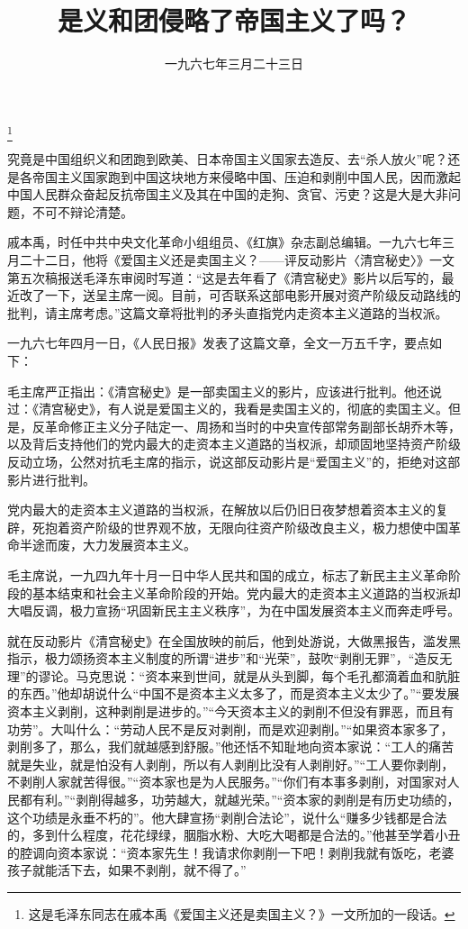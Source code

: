 
\title{是义和团侵略了帝国主义了吗？}
\date{一九六七年三月二十三日}
\thanks{这是毛泽东同志在戚本禹《爱国主义还是卖国主义？》一文所加的一段话。}
\maketitle


究竟是中国组织义和团跑到欧美、日本帝国主义国家去造反、去“杀人放火”呢？还是各帝国主义国家跑到中国这块地方来侵略中国、压迫和剥削中国人民，因而激起中国人民群众奋起反抗帝国主义及其在中国的走狗、贪官、污吏？这是大是大非问题，不可不辩论清楚。

\begin{maonote}
戚本禹，时任中共中央文化革命小组组员、《红旗》杂志副总编辑。一九六七年三月二十二日，他将《爱国主义还是卖国主义？——评反动影片〈清宫秘史〉》一文第五次稿报送毛泽东审阅时写道：“这是去年看了《清宫秘史》影片以后写的，最近改了一下，送呈主席一阅。目前，可否联系这部电影开展对资产阶级反动路线的批判，请主席考虑。”这篇文章将批判的矛头直指党内走资本主义道路的当权派。

一九六七年四月一日，《人民日报》发表了这篇文章，全文一万五千字，要点如下：

毛主席严正指出：《清宫秘史》是一部卖国主义的影片，应该进行批判。他还说过：《清宫秘史》，有人说是爱国主义的，我看是卖国主义的，彻底的卖国主义。但是，反革命修正主义分子陆定一、周扬和当时的中央宣传部常务副部长胡乔木等，以及背后支持他们的党内最大的走资本主义道路的当权派，却顽固地坚持资产阶级反动立场，公然对抗毛主席的指示，说这部反动影片是“爱国主义”的，拒绝对这部影片进行批判。

党内最大的走资本主义道路的当权派，在解放以后仍旧日夜梦想着资本主义的复辟，死抱着资产阶级的世界观不放，无限向往资产阶级改良主义，极力想使中国革命半途而废，大力发展资本主义。

毛主席说，一九四九年十月一日中华人民共和国的成立，标志了新民主主义革命阶段的基本结束和社会主义革命阶段的开始。党内最大的走资本主义道路的当权派却大唱反调，极力宣扬“巩固新民主主义秩序”，为在中国发展资本主义而奔走呼号。

就在反动影片《清宫秘史》在全国放映的前后，他到处游说，大做黑报告，滥发黑指示，极力颂扬资本主义制度的所谓“进步”和“光荣”，鼓吹“剥削无罪”，“造反无理”的谬论。马克思说：“资本来到世间，就是从头到脚，每个毛孔都滴着血和肮脏的东西。”他却胡说什么“中国不是资本主义太多了，而是资本主义太少了。”“要发展资本主义剥削，这种剥削是进步的。”“今天资本主义的剥削不但没有罪恶，而且有功劳”。大叫什么：“劳动人民不是反对剥削，而是欢迎剥削。”“如果资本家多了，剥削多了，那么，我们就越感到舒服。”他还恬不知耻地向资本家说：“工人的痛苦就是失业，就是怕没有人剥削，所以有人剥削比没有人剥削好。”“工人要你剥削，不剥削人家就苦得很。”“资本家也是为人民服务。”“你们有本事多剥削，对国家对人民都有利。”“剥削得越多，功劳越大，就越光荣。”“资本家的剥削是有历史功绩的，这个功绩是永垂不朽的”。他大肆宣扬“剥削合法论”，说什么“赚多少钱都是合法的，多到什么程度，花花绿绿，胭脂水粉、大吃大喝都是合法的。”他甚至学着小丑的腔调向资本家说：“资本家先生！我请求你剥削一下吧！剥削我就有饭吃，老婆孩子就能活下去，如果不剥削，就不得了。”


\end{maonote}
